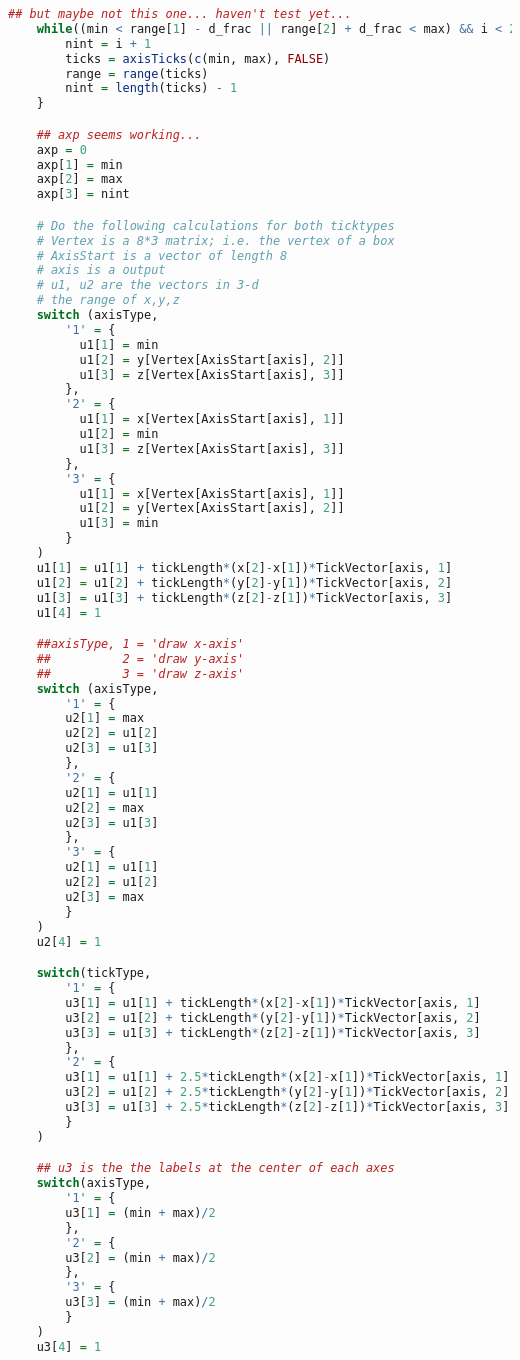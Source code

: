 \begin{lstlisting}[language = R]
    ## but maybe not this one... haven't test yet...
    while((min < range[1] - d_frac || range[2] + d_frac < max) && i < 20) {
        nint = i + 1
        ticks = axisTicks(c(min, max), FALSE)
        range = range(ticks)
        nint = length(ticks) - 1
    }

    ## axp seems working...
    axp = 0
    axp[1] = min
    axp[2] = max
    axp[3] = nint

    # Do the following calculations for both ticktypes
    # Vertex is a 8*3 matrix; i.e. the vertex of a box
    # AxisStart is a vector of length 8
    # axis is a output 
    # u1, u2 are the vectors in 3-d 
    # the range of x,y,z
    switch (axisType,
        '1' = {
          u1[1] = min
          u1[2] = y[Vertex[AxisStart[axis], 2]]
          u1[3] = z[Vertex[AxisStart[axis], 3]]
        },
        '2' = {
          u1[1] = x[Vertex[AxisStart[axis], 1]]
          u1[2] = min
          u1[3] = z[Vertex[AxisStart[axis], 3]]
        },
        '3' = {
          u1[1] = x[Vertex[AxisStart[axis], 1]]
          u1[2] = y[Vertex[AxisStart[axis], 2]]
          u1[3] = min
        }
    )
    u1[1] = u1[1] + tickLength*(x[2]-x[1])*TickVector[axis, 1]
    u1[2] = u1[2] + tickLength*(y[2]-y[1])*TickVector[axis, 2]
    u1[3] = u1[3] + tickLength*(z[2]-z[1])*TickVector[axis, 3]
    u1[4] = 1

    ##axisType, 1 = 'draw x-axis'
    ##          2 = 'draw y-axis'
    ##          3 = 'draw z-axis'
    switch (axisType,
        '1' = {
        u2[1] = max
        u2[2] = u1[2]
        u2[3] = u1[3]
        },
        '2' = {
        u2[1] = u1[1]
        u2[2] = max
        u2[3] = u1[3]
        },
        '3' = {
        u2[1] = u1[1]
        u2[2] = u1[2]
        u2[3] = max
        }
    )
    u2[4] = 1

    switch(tickType,
        '1' = { 
        u3[1] = u1[1] + tickLength*(x[2]-x[1])*TickVector[axis, 1]
        u3[2] = u1[2] + tickLength*(y[2]-y[1])*TickVector[axis, 2]
        u3[3] = u1[3] + tickLength*(z[2]-z[1])*TickVector[axis, 3]
        },
        '2' = {
        u3[1] = u1[1] + 2.5*tickLength*(x[2]-x[1])*TickVector[axis, 1]
        u3[2] = u1[2] + 2.5*tickLength*(y[2]-y[1])*TickVector[axis, 2]
        u3[3] = u1[3] + 2.5*tickLength*(z[2]-z[1])*TickVector[axis, 3]
        }
    )

    ## u3 is the the labels at the center of each axes
    switch(axisType,
        '1' = {
        u3[1] = (min + max)/2
        },
        '2' = {
        u3[2] = (min + max)/2
        },
        '3' = {
        u3[3] = (min + max)/2
        }
    )
    u3[4] = 1


\end{lstlisting}
